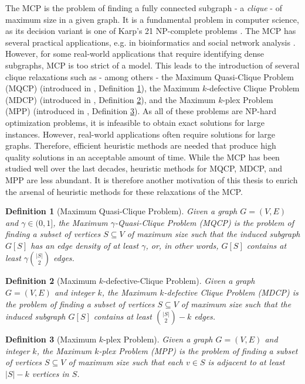 \documentclass [11pt]{article}
\newtheorem{definition}{Definition}[section]
\begin{document}
The MCP is the problem of finding a fully connected subgraph - a \textit{clique} - of maximum size in a given graph. It is a fundamental problem in computer science, as its decision variant is one of Karp's 21 NP-complete problems \cite{Karp1972}. The MCP has several practical applications, e.g. in bioinformatics \cite{Dognin2010} and social network analysis \cite{Pattillo_network_analysis_2013}. However, for some real-world applications that require identifying dense subgraphs, MCP is too strict of a model. This leads to the introduction of several clique relaxations such as - among others - the Maximum Quasi-Clique Problem (MQCP) (introduced in \cite{Abello2002}, Definition \ref{def:mqcp}), the Maximum $k$-defective Clique Problem (MDCP) (introduced in \cite{Yu2006}, Definition \ref{def:mdcp}), and the Maximum $k$-plex Problem (MPP) (introduced in \cite{Seidman1978}, Definition \ref{def:mpp}). 
As all of these problems are NP-hard optimization problems, it is infeasible to obtain exact solutions for large instances. However, real-world applications often require solutions for large graphs. Therefore, efficient heuristic methods are needed that produce high quality solutions in an acceptable amount of time. While the MCP has been studied well over the last decades, heuristic methods for MQCP, MDCP, and MPP are less abundant. It is therefore another motivation of this thesis to enrich the arsenal of heuristic methods for these relaxations of the MCP. 

\begin{definition}[Maximum Quasi-Clique Problem]
	\label{def:mqcp}
	Given a graph $G = (V,E)$ and $\gamma \in (0,1]$, the Maximum $\gamma$-Quasi-Clique Problem (MQCP) is the problem of finding a subset of vertices $S \subseteq V$ of maximum size 
	such that the induced subgraph $G[S]$ has an edge density of at least $\gamma$, or, in other words, $G[S]$ contains at least $\gamma { |S| \choose 2 }$ edges. 
\end{definition}

\begin{definition}[Maximum $k$-defective-Clique Problem]
	\label{def:mdcp}
	Given a graph $G = (V,E)$ and integer $k$, the Maximum $k$-defective Clique Problem (MDCP) is the problem of finding a subset of vertices $S \subseteq V$ of maximum size 
	such that the induced subgraph $G[S]$ contains at least ${|S| \choose 2} - k$ edges. 
\end{definition}

\begin{definition}[Maximum $k$-plex Problem]
	\label{def:mpp}
	Given a graph $G = (V,E)$ and integer $k$, the Maximum $k$-plex Problem (MPP) is the problem of finding a subset of vertices $S \subseteq V$ of maximum size 
	such that each $v \in S$ is adjacent to at least $|S| - k$ vertices in $S$. 
\end{definition}
\end{document}
